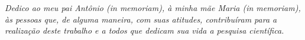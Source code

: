 \begin{center}
{\centering \it Dedico ao meu pai Antônio (in memoriam), à minha mãe Maria (in memoriam), às pessoas que, de alguma maneira, com suas atitudes, contribuíram para a realização deste trabalho e a todos que dedicam sua vida a pesquisa científica.}
\end{center} 
